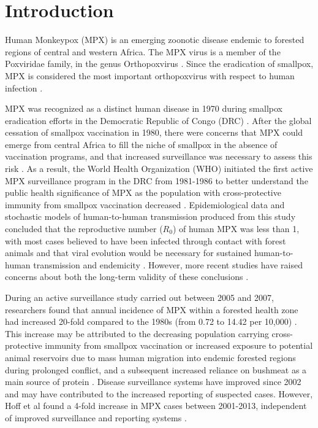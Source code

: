 \section{Introduction}
Human Monkeypox (MPX) is an emerging zoonotic disease endemic to forested regions of central and western Africa. The MPX virus is a member of the Poxviridae family, in the genus Orthopoxvirus \cite{Kulesh2004}. Since the eradication of smallpox, MPX is considered the most important orthopoxvirus with respect to human infection \cite{Khodakevich1988, WorldHealthOraganization1980, Fine1988}.

MPX was recognized as a distinct human disease in 1970 during smallpox eradication efforts in the Democratic Republic of Congo (DRC) \cite{Foster1972, WorldHealthOraganization1984}. After the global cessation of smallpox vaccination in 1980, there were concerns that MPX could emerge from central Africa to fill the niche of smallpox in the absence of vaccination programs, and that increased surveillance was necessary to assess this risk \cite{WorldHealthOraganization1980, Rimoin2010}. As a result, the World Health Organization (WHO) initiated the first active MPX surveillance program in the DRC from 1981-1986 to better understand the public health significance of MPX as the population with cross-protective immunity from smallpox vaccination decreased \cite{WorldHealthOraganization1980}. Epidemiological data and stochastic models of human-to-human transmission produced from this study concluded that the reproductive number ($R_{0}$) of human MPX was less than 1, with most cases believed to have been infected through contact with forest animals and that viral evolution would be necessary for sustained human-to-human transmission and endemicity \cite{Fine1988, Jezek1986, Jezek1987, Jezek1986, DiGiulio2004}. However, more recent studies have raised concerns about both the long-term validity of these conclusions \cite{Rimoin2010, Blumberg2013}.

During an active surveillance study carried out between 2005 and 2007, researchers found that annual incidence of MPX within a forested health zone had increased 20-fold compared to the 1980s (from 0.72 to 14.42 per 10,000) \cite{Rimoin2010}. This increase may be attributed to the decreasing population carrying cross-protective immunity from smallpox vaccination or increased exposure to potential animal reservoirs due to mass human migration into endemic forested regions during prolonged conflict, and a subsequent increased reliance on bushmeat as a main source of protein \cite{Rimoin2010, Hoff2014, Rimoin2007}. Disease surveillance systems have improved since 2002 and may have contributed to the increased reporting of suspected cases. However, Hoff et al found a 4-fold increase in MPX cases between 2001-2013, independent of improved surveillance and reporting systems \cite{Hoff2014}. 

